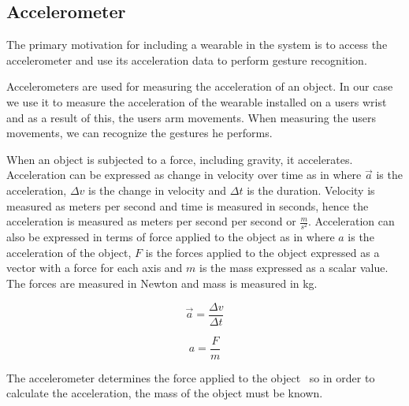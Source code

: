 \subsection{Accelerometer}

The primary motivation for including a wearable in the system is to access the accelerometer and use its acceleration data to perform gesture recognition.

Accelerometers are used for measuring the acceleration of an object. In our case we use it to measure the acceleration of the wearable installed on a users wrist and as a result of this, the users arm movements. When measuring the users movements, we can recognize the gestures he performs.

When an object is subjected to a force, including gravity, it accelerates. Acceleration can be expressed as change in velocity over time as in  where $\vec{a}$ is the acceleration, $\Delta v$ is the change in velocity and $\Delta t$ is the duration.
Velocity is measured as meters per second and time is measured in seconds, hence the acceleration is measured as meters per second per second or $\frac{m}{s^2}$.
Acceleration can also be expressed in terms of force applied to the object as in  where $a$ is the acceleration of the object, $F$ is the forces applied to the object expressed as a vector with a force for each axis and $m$ is the mass expressed as a scalar value.
The forces are measured in Newton and mass is measured in kg.

\begin{centering}
\begin{minipage}{.5\linewidth}
    \begin{equation}
    \vec{a} = \frac{\Delta v}{\Delta t}
    \label{eq:acceleration-delta-velocity}
    \end{equation}
\end{minipage}
\begin{minipage}{.5\linewidth}
    \begin{equation}
    a = \frac{F}{m}
    \label{eq:acceleration-force}
    \end{equation}
\end{minipage}
\end{centering}

The accelerometer determines the force applied to the object~\cite[pp. 392-393]{Fraden:2112745} so in order to calculate the acceleration, the mass of the object must be known.


